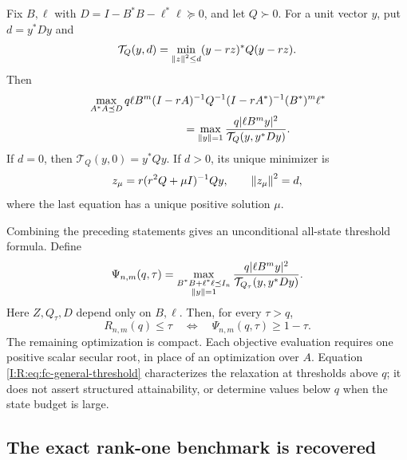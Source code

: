 \begin{lemma}
\label{I:R:lem:fc-trust}
Fix $B,\ell$ with $D=I-B^*B-\ell^*\ell\succeq0$, and let $Q\succ0$.
For a unit vector $y$, put $d=y^*Dy$ and
\begin{equation}
 \mathcal T_Q(y,d)=\min_{\left\lVert z\right\rVert^2\le d}(y-rz)^*Q(y-rz).
 \label{I:R:eq:fc-trust-value}
\end{equation}
Then
\begin{align}
 &\max_{A^*A\preceq D}
 q\ell B^m(I-rA)^{-1}Q^{-1}(I-rA^*)^{-1}(B^*)^m\ell^*
 \nonumber\\[-2pt]
 &\hspace{30mm}=\max_{\Rnorm{y}=1}
       \frac{q|\ell B^m y|^2}{\mathcal T_Q(y,y^*Dy)}.
 \label{I:R:eq:fc-eliminate-A}
\end{align}
If $d=0$, then $\mathcal T_Q(y,0)=y^*Qy$. If $d>0$, its unique minimizer is
\begin{equation}
 z_\mu=r(r^2Q+\mu I)^{-1}Qy,
 \qquad \left\lVert z_\mu\right\rVert^2=d,
 \label{I:R:eq:fc-secular}
\end{equation}
where the last equation has a unique positive solution $\mu$.
\end{lemma}


Combining the preceding statements gives an unconditional all-state threshold
formula. Define
\begin{equation}
 \Psi_{n,m}(q,\tau)=
 \max_{\substack{B^*B+\ell^*\ell\preceq I_n\\\left\lVert y\right\rVert=1}}
 \frac{q|\ell B^m y|^2}{\mathcal T_{Q_\tau}(y,y^*Dy)}.
 \label{I:R:eq:fc-Psi}
\end{equation}
Here $Z,Q_\tau,D$ depend only on $B,\ell$. Then, for every $\tau>q$,
\begin{equation}
 \boxed{R_{n,m}(q)\le\tau
       \quad\Longleftrightarrow\quad
       \Psi_{n,m}(q,\tau)\ge1-\tau.}
 \label{I:R:eq:fc-general-threshold}
\end{equation}
The remaining optimization is compact. Each objective evaluation requires one
positive scalar secular root, in place of an optimization over $A$.
Equation \eqref{I:R:eq:fc-general-threshold} characterizes the relaxation at
thresholds above $q$; it does not assert structured attainability, or determine
values below $q$ when the state budget is large.

\subsection{The exact rank-one benchmark is recovered}

